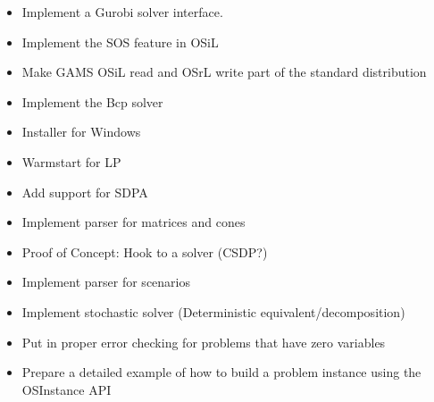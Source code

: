 %
%

\label{section:future-work}

\begin{itemize}
\item Implement a Gurobi solver interface.


\item Implement the SOS feature in OSiL



\item Make GAMS OSiL read and OSrL write part of the standard distribution

\item Implement the Bcp solver

\item Installer for Windows


\item Warmstart for LP

\item Add support for SDPA

\item Implement parser for matrices and cones

\item Proof of Concept: Hook to a solver (CSDP?)

\item Implement parser for scenarios

\item Implement stochastic solver (Deterministic equivalent/decomposition)

\item Put in proper error checking for problems that have zero variables

\item Prepare a detailed example of how to build a problem instance using the OSInstance API


\end{itemize}

